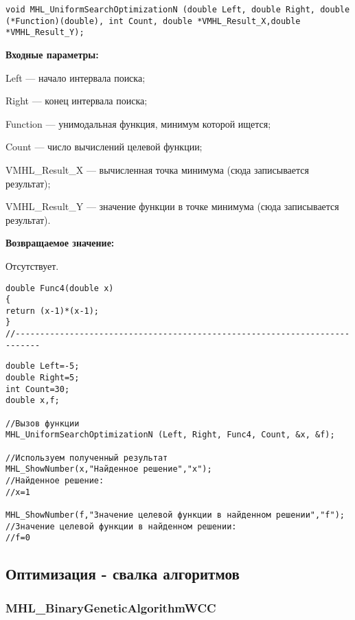 \documentclass[a4paper,12pt]{article}
\begin{document}
\begin{lstlisting}[label=code_syntax_MHL_UniformSearchOptimizationN,caption=Синтаксис]
void MHL_UniformSearchOptimizationN (double Left, double Right, double (*Function)(double), int Count, double *VMHL_Result_X,double *VMHL_Result_Y);
\end{lstlisting}

\textbf{Входные параметры:}

 Left --- начало интервала поиска;
 
Right --- конец интервала поиска;
 
Function --- унимодальная функция, минимум которой ищется;
 
Count --- число вычислений целевой функции;
 
VMHL\_Result\_X --- вычисленная точка минимума (сюда записывается результат);
 
VMHL\_Result\_Y --- значение функции в точке минимума (сюда записывается результат).

\textbf{Возвращаемое значение:}
 
 Отсутствует.

\begin{lstlisting}[caption=Оптимизируемая функция]
double Func4(double x)
{
return (x-1)*(x-1);
}
//---------------------------------------------------------------------------
\end{lstlisting}


\begin{lstlisting}[label=code_use_MHL_UniformSearchOptimizationN,caption=Пример использования]
double Left=-5;
double Right=5;
int Count=30;
double x,f;

//Вызов функции
MHL_UniformSearchOptimizationN (Left, Right, Func4, Count, &x, &f);

//Используем полученный результат
MHL_ShowNumber(x,"Найденное решение","x");
//Найденное решение:
//x=1

MHL_ShowNumber(f,"Значение целевой функции в найденном решении","f");
//Значение целевой функции в найденном решении:
//f=0
\end{lstlisting}

\subsection{Оптимизация - свалка алгоритмов}

\subsubsection{MHL\_BinaryGeneticAlgorithmWCC}\label{MHL_BinaryGeneticAlgorithmWCC}
\end{document}
